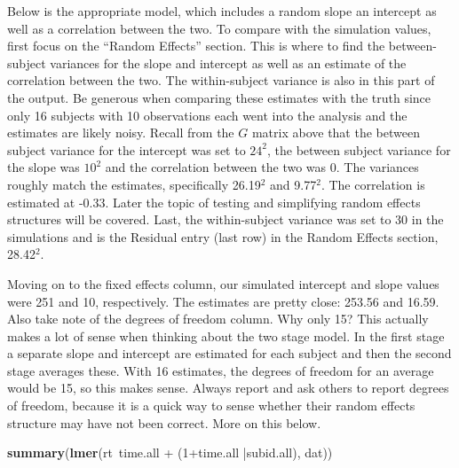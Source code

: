 \documentclass[]{book}
\newenvironment{Shaded}{\begin{snugshade}}{\end{snugshade}}
\newcommand{\KeywordTok}[1]{\textcolor[rgb]{0.13,0.29,0.53}{\textbf{{#1}}}}
\newcommand{\DecValTok}[1]{\textcolor[rgb]{0.00,0.00,0.81}{{#1}}}
\newcommand{\StringTok}[1]{\textcolor[rgb]{0.31,0.60,0.02}{{#1}}}
\newcommand{\NormalTok}[1]{{#1}}
\begin{document}
Below is the appropriate model, which includes a random slope an
intercept as well as a correlation between the two. To compare with the
simulation values, first focus on the ``Random Effects'' section. This
is where to find the between-subject variances for the slope and
intercept as well as an estimate of the correlation between the two. The
within-subject variance is also in this part of the output. Be generous
when comparing these estimates with the truth since only 16 subjects
with 10 observations each went into the analysis and the estimates are
likely noisy. Recall from the \(G\) matrix above that the between
subject variance for the intercept was set to \(24^2\), the between
subject variance for the slope was \(10^2\) and the correlation between
the two was 0. The variances roughly match the estimates, specifically
26.19\(^2\) and 9.77\(^2\). The correlation is estimated at -0.33. Later
the topic of testing and simplifying random effects structures will be
covered. Last, the within-subject variance was set to 30 in the
simulations and is the Residual entry (last row) in the Random Effects
section, 28.42\(^2\).

Moving on to the fixed effects column, our simulated intercept and slope
values were 251 and 10, respectively. The estimates are pretty close:
253.56 and 16.59. Also take note of the degrees of freedom column. Why
only 15? This actually makes a lot of sense when thinking about the two
stage model. In the first stage a separate slope and intercept are
estimated for each subject and then the second stage averages these.
With 16 estimates, the degrees of freedom for an average would be 15, so
this makes sense. Always report and ask others to report degrees of
freedom, because it is a quick way to sense whether their random effects
structure may have not been correct. More on this below.

\begin{Shaded}
\begin{Highlighting}[]
\KeywordTok{summary}\NormalTok{(}\KeywordTok{lmer}\NormalTok{(rt~time.all +}\StringTok{ }\NormalTok{(}\DecValTok{1}\NormalTok{+time.all |subid.all), dat))}
\end{Highlighting}
\end{Shaded}
\end{document}
